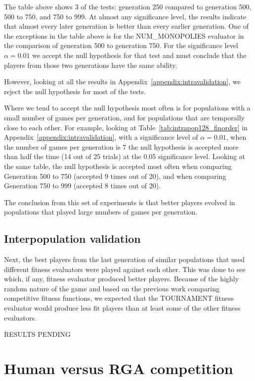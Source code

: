 The table above shows 3 of the tests: generation 250 compared to generation 500,
500 to 750, and 750 to 999. At almost any significance level, the results
indicate that almost every later generation is better than every earlier
generation. One of the exceptions in the table above is for the NUM\_MONOPOLIES
evaluator in the comparison of generation 500 to generation 750. For the
significance level \(\alpha=0.01\) we accept the null hypothesis for that
test and must conclude that the players from those two generations have the same
ability.

However, looking at all the results in Appendix~\ref{appendix:intravalidation},
we reject the null hypothesis for most of the tests.

Where we tend to accept the null hypothesis most often is for populations with a
small number of games per generation, and for populations that are temporally
close to each other. For example, looking at
Table~\ref{tab:intrapop128_finorder} in Appendix~\ref{appendix:intravalidation},
with a significance level of \(\alpha=0.01\), when the number of games per
generation is 7 the null hypothesis is accepted more than half the time (14 out
of 25 trials) at the 0.05 significance level. Looking at the same table, the
null hypothesis is accepted most often when comparing Generation 500 to 750
(accepted 9 times out of 20), and when comparing Generation 750 to 999 (accepted
8 times out of 20).

The conclusion from this set of experiments is that better players evolved in
populations that played large numbers of games per generation.

\subsection{Interpopulation validation} \label{6_interPopValidation}

Next, the best players from the last generation of similar populations that used
different fitness evaluators were played against each other. This was done to
see which, if any, fitness evaluator produced better players. Because of the
highly random nature of the game and based on the previous work comparing
competitive fitness functions, we expected that the TOURNAMENT fitness evaluator
would produce less fit players than at least some of the other fitness
evaluators.

RESULTS PENDING

\section{Human versus RGA competition}\label{6_humanValidation}

